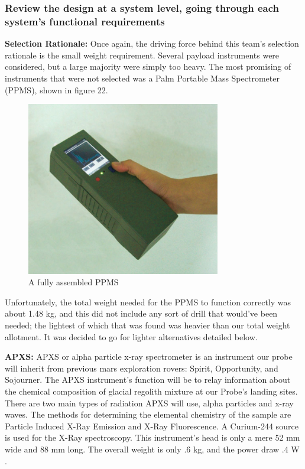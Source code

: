 \documentclass[%
 portrait,
 aapm,
 mph,%
 amsmath,amssymb,
 reprint,%
]{revtex4-2}
\begin{document}
\subsubsection{Review the design at a system level, going through each system’s
functional requirements}
\textbf{Selection Rationale:} Once again, the driving force behind this team's selection rationale is the small weight requirement. Several payload instruments were considered, but a large majority were simply too heavy. The most promising of instruments that were not selected was a Palm Portable Mass Spectrometer (PPMS), shown in figure 22. 
\begin{figure}[h!]
  \includegraphics[width=240pt]{Instruments/5_1_1_PPMS.png}
   \caption{A fully assembled PPMS \cite{yang2008development}}
\end{figure} 
Unfortunately, the total weight needed for the PPMS to function correctly was about 1.48 kg, and this did not include any sort of drill that would've been needed; the lightest of which that was found was heavier than our total weight allotment. It was decided to go for lighter alternatives detailed below. 

\textbf{APXS: }APXS or alpha particle x-ray spectrometer is an instrument our probe will inherit from previous mars exploration rovers: Spirit, Opportunity, and Sojourner. The APXS instrument’s function will be to relay information about the chemical composition of glacial regolith mixture at our Probe’s landing sites. There are two main types of radiation APXS will use, alpha particles and x-ray waves. The methods for determining the elemental chemistry of the sample are Particle Induced X-Ray Emission and X-Ray Fluorescence. A Curium-244 source is used for the X-Ray spectroscopy. This instrument's head is only a mere 52 mm wide and 88 mm long. The overall weight is only .6 kg, and the power draw .4 W \cite{bruckner2003refined}. 
\end{document}
